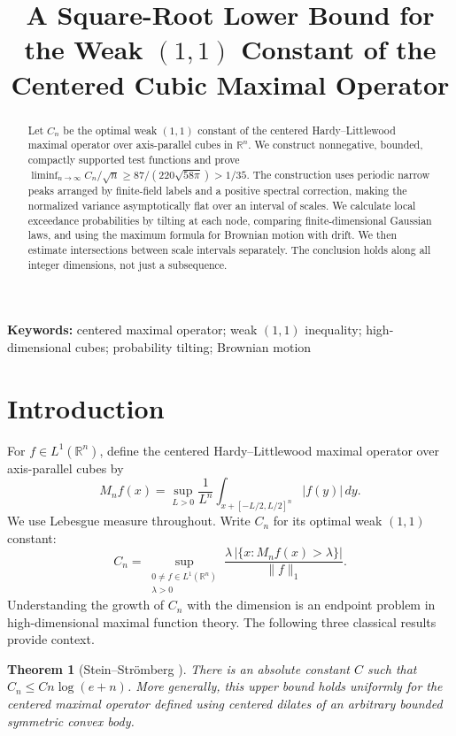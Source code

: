 \documentclass[a4paper,11pt]{article}
\title{A Square-Root Lower Bound for the Weak $(1,1)$ Constant of the Centered Cubic Maximal Operator}
\date{}
\newtheorem{historical}{Theorem}
\theoremstyle{remark}
\begin{document}
\maketitle
\vspace{-2em}
\begin{abstract}
Let $C_n$ be the optimal weak $(1,1)$ constant of the centered Hardy--Littlewood maximal operator over axis-parallel cubes in $\mathbb R^n$.
We construct nonnegative, bounded, compactly supported test functions and prove
$\liminf_{n\to\infty}C_n/\sqrt n\ge87/(220\sqrt{58\pi})>1/35$.
The construction uses periodic narrow peaks arranged by finite-field labels and a positive spectral correction, making the normalized variance asymptotically flat over an interval of scales.
We calculate local exceedance probabilities by tilting at each node, comparing finite-dimensional Gaussian laws, and using the maximum formula for Brownian motion with drift. We then estimate intersections between scale intervals separately. The conclusion holds along all integer dimensions, not just a subsequence.
\end{abstract}
\noindent\textbf{Keywords:} centered maximal operator; weak $(1,1)$ inequality; high-dimensional cubes; probability tilting; Brownian motion
\par\medskip
\section{Introduction}
For $f\in L^1(\mathbb R^n)$, define the centered Hardy--Littlewood maximal operator over axis-parallel cubes by
\[
 M_nf(x)=\sup_{L>0}\frac1{L^n}\int_{x+[-L/2,L/2]^n}|f(y)|\,dy.
\]
We use Lebesgue measure throughout. Write $C_n$ for its optimal weak $(1,1)$ constant:
\begin{equation}\label{eq:definitionCn}
 C_n=\sup_{\substack{0\ne f\in L^1(\mathbb R^n)\\ \lambda>0}}
 \frac{\lambda\,|\{x:M_nf(x)>\lambda\}|}{\|f\|_1}.
\end{equation}
Understanding the growth of $C_n$ with the dimension is an endpoint problem in high-dimensional maximal function theory. The following three classical results provide context.

\begin{historical}[Stein--Strömberg \cite{SS1983}]
There is an absolute constant $C$ such that $C_n\le Cn\log(e+n)$.
More generally, this upper bound holds uniformly for the centered maximal operator defined using centered dilates of an arbitrary bounded symmetric convex body.
\end{historical}
\end{document}

